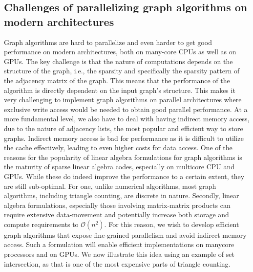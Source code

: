 \subsection{Challenges of parallelizing graph algorithms on modern architectures}
Graph algorithms are hard to parallelize and even harder to get good performance on modern architectures, both on many-core CPUs as well as on GPUs. The key challenge is that the nature of computations depends on the structure of the graph, i.e., the sparsity and specifically the sparsity pattern of the adjacency matrix of the graph. This means that the performance of the algorithm is directly dependent on the input graph's structure. This makes it very challenging to implement graph algorithms on parallel architectures where exclusive write access would be needed to obtain good parallel performance. At a more fundamental level, we also have to deal with having indirect memory access, due to the nature of adjacency lists, the most popular and efficient way to store graphs. Indirect memory access is bad for performance as it is difficult to utilize the cache effectively, leading to even higher costs for data access. One of the reasons for the popularity of linear algebra formulations for graph algorithms is the maturity of sparse linear algebra codes, especially on multicore CPU and GPUs. While these do indeed improve the performance to a certain extent, they are still sub-optimal. For one, unlike numerical algorithms, most graph algorithms, including triangle counting, are discrete in nature. Secondly, linear algebra formulations, especially those involving matrix-matrix products can require extensive data-movement and potentially increase both storage and compute requirements to $\mathcal{O}(n^2)$. For this reason, we wish to develop efficient graph algorithms that expose fine-grained parallelism and avoid indirect memory access. Such a formulation will enable efficient implementations on manycore processors and on GPUs. We now illustrate this idea using an example of set intersection, as that is one of the most expensive parts of triangle counting.

